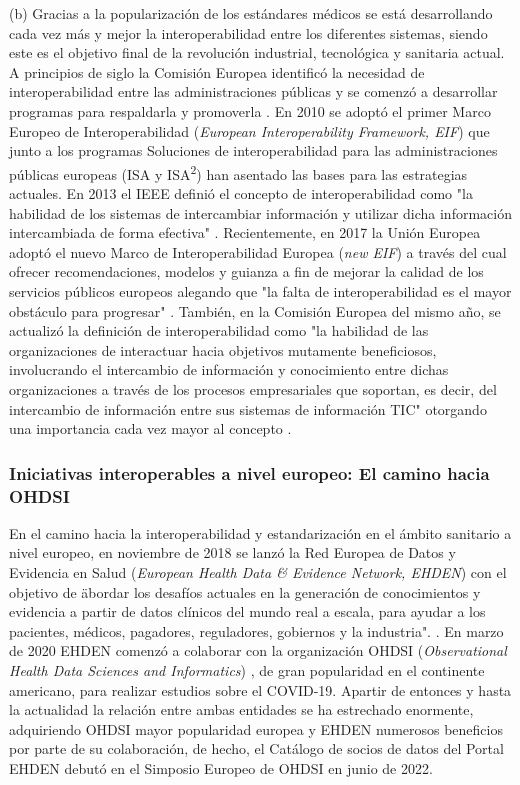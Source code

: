 (b) Gracias a la popularización de los estándares médicos se está desarrollando cada vez más y mejor la interoperabilidad entre los diferentes sistemas, siendo este es el objetivo final de la revolución industrial, tecnológica y sanitaria actual. A principios de siglo la Comisión Europea identificó la necesidad de interoperabilidad entre las administraciones públicas y se comenzó a desarrollar programas para respaldarla y promoverla \cite{CEU1999ida}. En 2010 se adoptó el primer Marco Europeo de Interoperabilidad (\textit{European Interoperability Framework, EIF}) que junto a los programas Soluciones de interoperabilidad para las administraciones públicas europeas (ISA y ISA\textsuperscript{2}) han asentado las bases para las estrategias actuales. En 2013 el IEEE definió el concepto de interoperabilidad como "la habilidad de los sistemas de intercambiar información y utilizar dicha información intercambiada de forma efectiva" \cite{berryman2013data}. Recientemente, en 2017 la Unión Europea adoptó el nuevo Marco de Interoperabilidad Europea (\textit{new EIF})  a través del cual ofrecer recomendaciones, modelos y guianza a fin de mejorar la calidad de los servicios públicos europeos alegando que "la falta de interoperabilidad es el mayor obstáculo para progresar" \cite{kouroubali2019new}. También, en la Comisión Europea del mismo año, se actualizó la definición de interoperabilidad como "la habilidad de las organizaciones de interactuar hacia objetivos mutamente beneficiosos, involucrando el intercambio de información y conocimiento entre dichas organizaciones a través de los procesos empresariales que soportan, es decir, del intercambio de información entre sus sistemas de información TIC" otorgando una importancia cada vez mayor al concepto \cite{katehakis2019framework}\cite{CEU2017eif} \cite{casiano2022towards}.



\subsubsection{Iniciativas interoperables a nivel europeo: El camino hacia OHDSI}

En el camino hacia la interoperabilidad y estandarización en el ámbito sanitario a nivel europeo, en noviembre de 2018 se lanzó la Red Europea de Datos y Evidencia en Salud (\textit{European Health Data \& Evidence Network, EHDEN}) con el objetivo de \"abordar los desafíos actuales en la generación de conocimientos y evidencia a partir de datos clínicos del mundo real a escala, para ayudar a los pacientes, médicos, pagadores, reguladores, gobiernos y la industria". \cite{ehden}. En marzo de 2020 EHDEN comenzó a colaborar con la organización OHDSI (\textit{Observational Health Data Sciences and Informatics}) \cite{ohdsi}, de gran popularidad en el continente americano, para realizar estudios sobre el COVID-19. Apartir de entonces y hasta la actualidad la relación entre ambas entidades se ha estrechado enormente, adquiriendo OHDSI mayor popularidad europea y EHDEN numerosos beneficios por parte de su colaboración, de hecho, el Catálogo de socios de datos del Portal EHDEN debutó en el Simposio Europeo de OHDSI en junio de 2022. 

